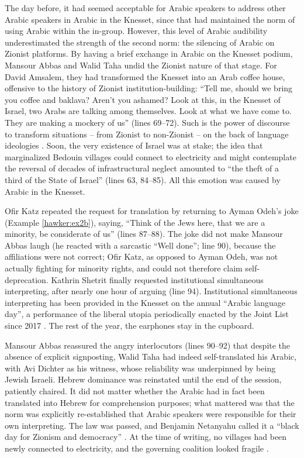 \documentclass[output=paper,arabicfont]{langscibook}
\begin{document}
The day before, it had seemed acceptable for Arabic speakers to address other Arabic speakers in Arabic in the Knesset, since that had maintained the norm of using Arabic within the in-group. However, this level of Arabic audibility underestimated the strength of the second norm: the silencing of Arabic on Zionist platforms. By having a brief exchange in Arabic on the Knesset podium, Mansour Abbas and Walid Taha undid the Zionist nature of that stage. For David Amsalem, they had transformed the Knesset into an Arab coffee house, offensive to the history of Zionist institution-building: “Tell me, should we bring you coffee and baklava? Aren’t you ashamed? Look at this, in the Knesset of Israel, two Arabs are talking among themselves. Look at what we have come to. They are making a mockery of us” (lines 69–72). Such is the power of discourse to transform situations – from Zionist to non-Zionist – on the back of language ideologies \citep{irvine2009a}. Soon, the very existence of Israel was at stake; the idea that marginalized Bedouin villages could connect to electricity and might contemplate the reversal of decades of infrastructural neglect amounted to “the theft of a third of the State of Israel” (lines 63, 84–85). All this emotion was caused by Arabic in the Knesset.

 Ofir Katz repeated the request for translation by returning to Ayman Odeh’s joke (Example \ref{hawker:ex2b}), saying, “Think of the Jews here, that we are a minority, be considerate of us” (lines 87–88). The joke did not make Mansour Abbas laugh (he reacted with a sarcastic “Well done”; line 90), because the affiliations were not correct; Ofir Katz, as opposed to Ayman Odeh, was not actually fighting for minority rights, and could not therefore claim self-deprecation. Kathrin Shetrit finally requested institutional simultaneous interpreting, after nearly one hour of arguing (line 94). Institutional simultaneous interpreting has been provided in the Knesset on the annual “Arabic language day”, a performance of the liberal utopia periodically enacted by the Joint List since 2017 \citep[53–55]{hawker2019a}. The rest of the year, the earphones stay in the cupboard.
 
Mansour Abbas reassured the angry interlocutors (lines 90–92) that despite the absence of explicit signposting, Walid Taha had indeed self-translated his Arabic, with Avi Dichter as his witness, whose reliability was underpinned by being Jewish Israeli. Hebrew dominance was reinstated until the end of the session, patiently chaired. It did not matter whether the Arabic had in fact been translated into Hebrew for comprehension purposes; what mattered was that the norm was explicitly re-established that Arabic speakers were responsible for their own interpreting. The law was passed, and Benjamin Netanyahu called it a “black day for Zionism and democracy” \citep{mualem2022a}. At the time of writing, no villages had been newly connected to electricity, and the governing coalition looked fragile \citep{abu2022a}. 
\end{document}
